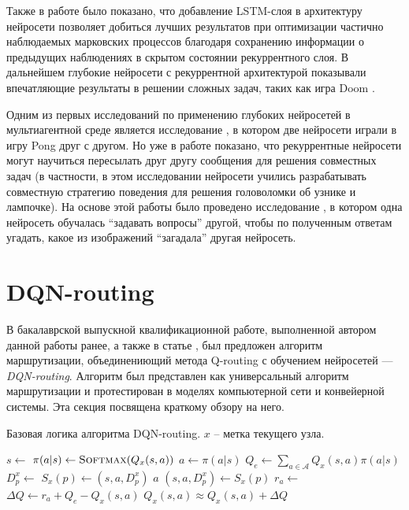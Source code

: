 \documentclass[specification,annotation,times]{itmo-student-thesis}
\theoremstyle{definition}
\begin{document}
Также в работе \cite{hausknecht2015deep} было показано, что добавление
LSTM-слоя \cite{hochreiter1997long} в архитектуру нейросети позволяет добиться
лучших результатов при оптимизации частично наблюдаемых марковских процессов
благодаря сохранению информации о предыдущих наблюдениях в скрытом состоянии
рекуррентного слоя. В дальнейшем глубокие нейросети с рекуррентной архитектурой
показывали впечатляющие результаты в решении сложных задач, таких как игра
Doom \cite{lample2016playing}.

Одним из первых исследований по применению глубоких нейросетей в мультиагентной
среде является исследование \cite{tampuu2017multiagent}, в котором две нейросети
играли в игру Pong друг с другом. Но уже в работе \cite{foerster2016learning}
показано, что рекуррентные нейросети могут научиться пересылать друг другу сообщения для решения
совместных задач (в частности, в этом исследовании нейросети учились
разрабатывать совместную стратегию поведения для решения головоломки об узнике и
лампочке). На основе этой работы было проведено исследование
\cite{jorge2016learning}, в котором одна нейросеть обучалась
\enquote{задавать вопросы} другой, чтобы по полученным ответам угадать, какое из
изображений \enquote{загадала} другая нейросеть.

\section{DQN-routing}

В бакалаврской выпускной квалификационной работе, выполненной автором данной
работы ранее, а также в статье \cite{mukhutdinov2019multi}, был
предложен алгоритм маршрутизации, объединениющий метода Q-routing с обучением
нейросетей --- \textit{DQN-routing}. Алгоритм был представлен как универсальный
алгоритм маршрутизации и протестирован в моделях компьютерной сети и конвейерной
системы. Эта секция посвящена краткому обзору на него.

\begin{algorithm}[!h]
\caption{Базовая логика алгоритма DQN-routing. $x$ -- метка текущего узла.}
\label{dqnr-pseudocode}
\begin{algorithmic}[1]
   
    \State $s \gets $ 
    \State $\pi(a | s) \gets \textsc{Softmax}(Q_x(s, a))$ 
    \State $a \gets \pi(a | s)$
    \State $Q_e \gets \sum\limits_{a \in \mathcal{A}} {Q_x(s, a) \pi(a | s)}$
    \State $D_p^x \gets $ 
    \State $S_x(p) \gets (s, a, D_p^x)$
    \State {}
    \State \Return $a$ 
  \EndFunction
  \Statex
    \State $(s, a, D_p^x) \gets S_x(p)$
    \State $r_a \gets $ 
    \State $\Delta Q \gets r_a + Q_e - Q_x(s, a)$
    \State $Q_x(s, a) \approx Q_x(s, a) + \Delta Q$ 
  \EndProcedure
\end{algorithmic}
\end{algorithm}
\end{document}
